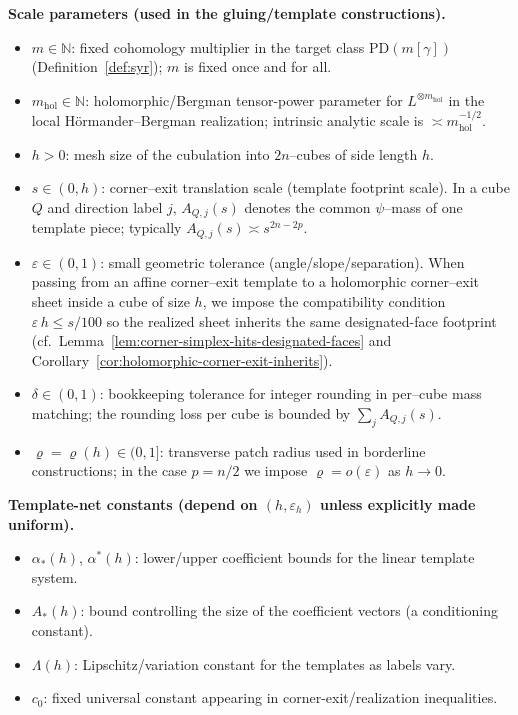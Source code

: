 \documentclass[11pt]{article}
\numberwithin{equation}{section}  %
\theoremstyle{plain}
\theoremstyle{definition}
\theoremstyle{remark}
\newcommand{\mhol}{m_{\mathrm{hol}}} %
\begin{document}
\noindent\textbf{Scale parameters (used in the gluing/template constructions).}
\begin{itemize}
\item $m\in\mathbb{N}$: fixed cohomology multiplier in the target class $\mathrm{PD}(m[\gamma])$ (Definition~\ref{def:syr});
$m$ is fixed once and for all.
\item $\mhol\in\mathbb{N}$: holomorphic/Bergman tensor-power parameter for $L^{\otimes \mhol}$ in the local
H\"ormander--Bergman realization; intrinsic analytic scale is $\asymp \mhol^{-1/2}$.
\item $h>0$: mesh size of the cubulation into $2n$--cubes of side length $h$.
\item $s\in(0,h)$: corner--exit translation scale (template footprint scale).  In a cube $Q$ and direction label $j$,
$A_{Q,j}(s)$ denotes the common $\psi$--mass of one template piece; typically $A_{Q,j}(s)\asymp s^{2n-2p}$.
\item $\varepsilon\in(0,1)$: small geometric tolerance (angle/slope/separation).  When passing from an affine corner--exit
template to a holomorphic corner--exit sheet inside a cube of size $h$, we impose the compatibility condition
{$\varepsilon\,h\le s/100$} so the realized sheet inherits the same designated-face footprint
(cf.\ Lemma~\ref{lem:corner-simplex-hits-designated-faces} and Corollary~\ref{cor:holomorphic-corner-exit-inherits}).
\item $\delta\in(0,1)$: bookkeeping tolerance for integer rounding in per--cube mass matching; the rounding loss per cube is
bounded by $\sum_j A_{Q,j}(s)$.
\item $\varrho=\varrho(h)\in(0,1]$: transverse patch radius used in borderline constructions; in the case $p=n/2$ we impose
$\varrho=o(\varepsilon)$ as $h\to 0$.
\end{itemize}



\noindent\textbf{Template-net constants (depend on $(h,\varepsilon_h)$ unless explicitly made uniform).}
\begin{itemize}
\item $\alpha_*(h)$, $\alpha^*(h)$: lower/upper coefficient bounds for the linear template system.
\item $A_*(h)$: bound controlling the size of the coefficient vectors (a conditioning constant).
\item $\Lambda(h)$: Lipschitz/variation constant for the templates as labels vary.
\item $c_0$: fixed universal constant appearing in corner-exit/realization inequalities.
\end{itemize}
\end{document}
